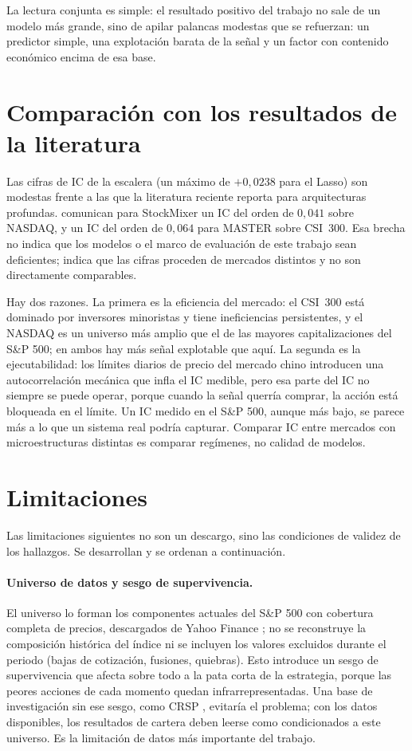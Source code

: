 La lectura conjunta es simple: el resultado positivo del trabajo no sale de un modelo más
grande, sino de apilar palancas modestas que se refuerzan: un predictor simple, una
explotación barata de la señal y un factor con contenido económico encima de esa base.

\section{Comparación con los resultados de la literatura}\label{sec:d-benchmarks}

Las cifras de IC de la escalera (un máximo de $+0{,}0238$ para el Lasso) son modestas
frente a las que la literatura reciente reporta para arquitecturas profundas.
\textcite{fan2024stockmixer} comunican para StockMixer un IC del orden de $0{,}041$ sobre
NASDAQ, y \textcite{li2024master} un IC del orden de $0{,}064$ para MASTER sobre CSI~300.
Esa brecha no indica que los modelos o el marco de evaluación de este trabajo sean
deficientes; indica que las cifras proceden de mercados distintos y no son directamente
comparables.

Hay dos razones. La primera es la eficiencia del mercado: el CSI~300 está dominado por
inversores minoristas y tiene ineficiencias persistentes, y el NASDAQ es un universo más
amplio que el de las mayores capitalizaciones del S\&P 500; en ambos hay más señal
explotable que aquí. La segunda es la ejecutabilidad: los límites diarios de precio del
mercado chino introducen una autocorrelación mecánica que infla el IC medible, pero esa
parte del IC no siempre se puede operar, porque cuando la señal querría comprar, la acción
está bloqueada en el límite. Un IC medido en el S\&P 500, aunque más bajo, se parece más a
lo que un sistema real podría capturar. Comparar IC entre mercados con microestructuras
distintas es comparar regímenes, no calidad de modelos.

\section{Limitaciones}\label{sec:d-limitaciones}

Las limitaciones siguientes no son un descargo, sino las condiciones de validez de los
hallazgos. Se desarrollan y se ordenan a continuación.

\paragraph{Universo de datos y sesgo de supervivencia.} El universo lo forman los
componentes actuales del S\&P 500 con cobertura completa de precios, descargados de Yahoo
Finance \autocite{yahoofinance}; no se reconstruye la composición histórica del índice ni
se incluyen los valores excluidos durante el periodo (bajas de cotización, fusiones,
quiebras). Esto introduce un sesgo de supervivencia que afecta sobre todo a la pata corta
de la estrategia, porque las peores acciones de cada momento quedan infrarrepresentadas.
Una base de investigación sin ese sesgo, como CRSP \autocite{crsp2025stock}, evitaría el
problema; con los datos disponibles, los resultados de cartera deben leerse como
condicionados a este universo. Es la limitación de datos más importante del trabajo.

